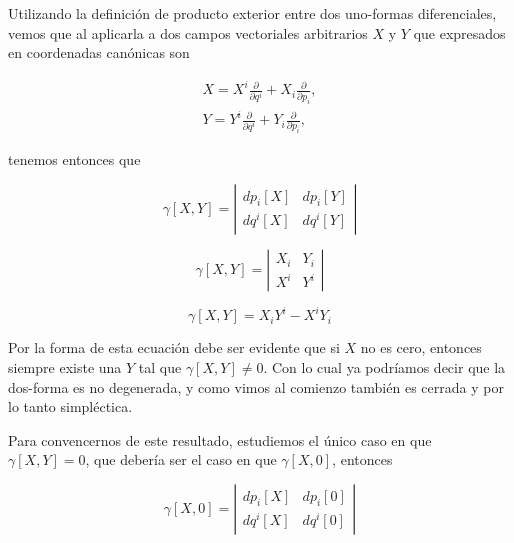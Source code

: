 \documentclass[a4paper,10pt]{article}
\numberwithin{equation}{section}
\begin{document}
\vspace{.3cm}

Utilizando la definición de producto exterior entre dos uno-formas diferenciales, vemos 
que al aplicarla a dos campos vectoriales arbitrarios $X$ y $Y$ que expresados 
en coordenadas canónicas son 

\begin{align}
 X = X^i\frac{\partial}{\partial q^i} + X_i\frac{\partial}{\partial p_i}, \\
 Y = Y^i\frac{\partial}{\partial q^i} + Y_i\frac{\partial}{\partial p_i},
\end{align}

tenemos entonces que

\begin{equation}
 \gamma[X,Y] = \left|\begin{matrix}
                dp_i[X] & dp_i[Y] \\
                dq^i[X] & dq^i[Y]
               \end{matrix}\right|
\end{equation}

\begin{equation}
 \gamma[X,Y] = \left|\begin{matrix}
                X_i & Y_i \\
                X^i & Y^i
               \end{matrix}\right|
\end{equation}

\begin{equation}
 \gamma[X,Y] = X_i Y^i - X^iY_i
\end{equation}

Por la forma de esta ecuación debe ser evidente que si $X$ no es cero, entonces 
siempre existe una $Y$ tal que $\gamma[X,Y] \ne 0$. Con lo cual ya podríamos decir 
que la dos-forma es no degenerada, y como vimos al comienzo también es cerrada 
y por lo tanto simpléctica. 

\vspace{.3cm}

Para convencernos de este resultado, estudiemos el único caso en que $\gamma[X,Y] = 0$, 
que debería ser el caso en que $\gamma[X,0]$, entonces 

\begin{equation}
 \gamma[X,0] = \left|\begin{matrix}
                dp_i[X] & dp_i[0] \\
                dq^i[X] & dq^i[0]
               \end{matrix}\right|
\end{equation}
\end{document}
